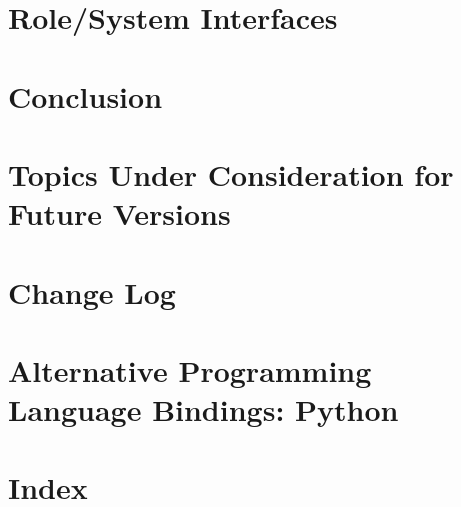 \documentclass[12pt]{report}
\begin{document}
	\chapter{Role/System Interfaces}\label{chap:Interfaces}
	

	\chapter{Conclusion}
	

	\nocite{*}

	\clearpage
	\providecommand*{\phantomsection}{}
	\phantomsection
	
	

	\begin{appendices}

		\chapter{Topics Under Consideration for Future Versions}
		

		\chapter{Change Log}
		

		\chapter{Alternative Programming Language Bindings: Python}
		

	\end{appendices}

	\clearpage
	\chapter{Index}
	{\scriptsize
	\printindex}
\end{document}
